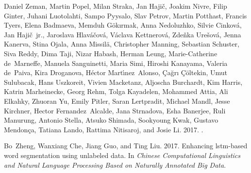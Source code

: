 \documentclass[11pt,a4paper]{article}
\begin{document}
\begin{thebibliography}{}
	Daniel Zeman, Martin Popel, Milan Straka, Jan Haji{\v{c}}, Joakim Nivre, Filip
	Ginter, Juhani Luotolahti, Sampo Pyysalo, Slav Petrov, Martin Potthast,
	Francis Tyers, Elena Badmaeva, Memduh G{\"{o}}k{\i}rmak, Anna Nedoluzhko,
	Silvie Cinkov{\'{a}}, Jan Haji{\v{c}}~jr., Jaroslava
	Hlav{\'{a}}{\v{c}}ov{\'{a}}, V{\'{a}}clava Kettnerov{\'{a}}, Zde{\v{n}}ka
	Ure{\v{s}}ov{\'{a}}, Jenna Kanerva, Stina Ojala, Anna Missil{\"{a}},
	Christopher Manning, Sebastian Schuster, Siva Reddy, Dima Taji, Nizar Habash,
	Herman Leung, Marie-Catherine de~Marneffe, Manuela Sanguinetti, Maria Simi,
	Hiroshi Kanayama, Valeria de~Paiva, Kira Droganova, H{\'{e}}ctor
	Mart{\'{\i}}nez~Alonso, {\c{C}}a{\u{g}}r{\i} {\c{C}}{\"{o}}ltekin, Umut
	Sulubacak, Hans Uszkoreit, Vivien Macketanz, Aljoscha Burchardt, Kim Harris,
	Katrin Marheinecke, Georg Rehm, Tolga Kayadelen, Mohammed Attia, Ali Elkahky,
	Zhuoran Yu, Emily Pitler, Saran Lertpradit, Michael Mandl, Jesse Kirchner,
	Hector Fernandez~Alcalde, Jana Strnadova, Esha Banerjee, Ruli Manurung,
	Antonio Stella, Atsuko Shimada, Sookyoung Kwak, Gustavo Mendon{\c{c}}a,
	Tatiana Lando, Rattima Nitisaroj, and Josie Li. 2017.
	.
	
	Bo~Zheng, Wanxiang Che, Jiang Guo, and Ting Liu. 2017.
	\newblock Enhancing lstm-based word segmentation using unlabeled data.
	\newblock In {\em Chinese Computational Linguistics and Natural Language
		Processing Based on Naturally Annotated Big Data\/}.
	
\end{thebibliography}
\end{document}
